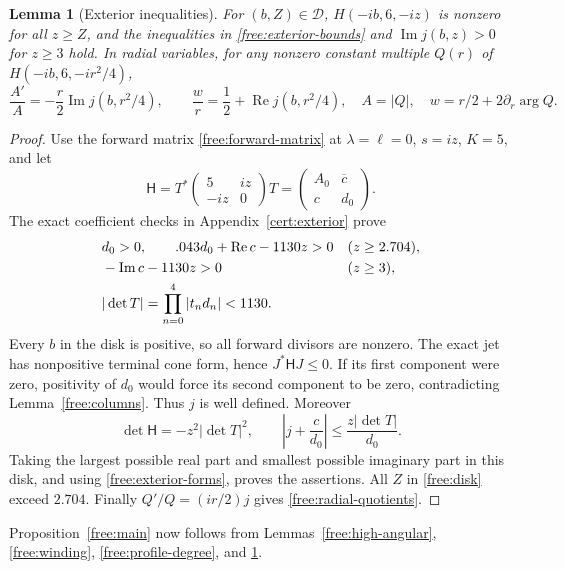 \documentclass[11pt]{article}
\numberwithin{equation}{section}
\newtheorem{lemma}[theorem]{Lemma}
\theoremstyle{definition}
\theoremstyle{remark}
\begin{document}
\begin{lemma}[Exterior inequalities]\label{free:exterior}
For $(b,Z)\in\mathcal D$, $H(-ib,6,-iz)$ is nonzero for all $z\ge Z$,
and the inequalities in \eqref{free:exterior-bounds} and
$\operatorname{Im}j(b,z)>0$ for $z\ge3$ hold.  In radial variables,
for any nonzero constant multiple $Q(r)$ of $H(-ib,6,-ir^2/4)$,
\begin{equation}\label{free:radial-quotients}
 \frac{A'}A=-\frac r2\operatorname{Im}j(b,r^2/4),\qquad
 \frac wr=\frac12+\operatorname{Re}j(b,r^2/4),
 \quad A=|Q|,\quad w=r/2+2\partial_r\arg Q.
\end{equation}
\end{lemma}

\begin{proof}
Use the forward matrix \eqref{free:forward-matrix} at
$\lambda=\ell=0$, $s=iz$, $K=5$, and let
\[
 \mathsf H=T^*\begin{pmatrix}5&iz\\-iz&0\end{pmatrix}T
   =\begin{pmatrix}A_0&\overline c\\c&d_0\end{pmatrix}.
\]
The exact coefficient checks in Appendix~\ref{cert:exterior} prove
\begin{align}\label{free:exterior-forms}
 &d_0>0,\qquad .043d_0+\operatorname{Re}c-1130z>0
 &&(z\ge2.704),\notag\\
 &-\operatorname{Im}c-1130z>0&&(z\ge3),\notag\\
 &|\det T|=\prod_{n=0}^4|t_nd_n|<1130.
\end{align}
Every $b$ in the disk is positive, so all forward divisors are
nonzero.  The exact jet has nonpositive terminal cone form, hence
$J^*\mathsf HJ\le0$.  If its first component were zero, positivity
of $d_0$ would force its second component to be zero, contradicting
Lemma~\ref{free:columns}.  Thus $j$ is well defined.  Moreover
\[
 \det\mathsf H=-z^2|\det T|^2,
 \qquad \left|j+\frac c{d_0}\right|
 \le\frac{z|\det T|}{d_0}.
\]
Taking the largest possible real part and smallest possible imaginary
part in this disk, and using \eqref{free:exterior-forms}, proves the
assertions.  All $Z$ in \eqref{free:disk} exceed $2.704$.
Finally $Q'/Q=(ir/2)j$ gives \eqref{free:radial-quotients}.
\end{proof}

Proposition~\ref{free:main} now follows from
Lemmas~\ref{free:high-angular}, \ref{free:winding},
\ref{free:profile-degree}, and \ref{free:exterior}.
\end{document}
